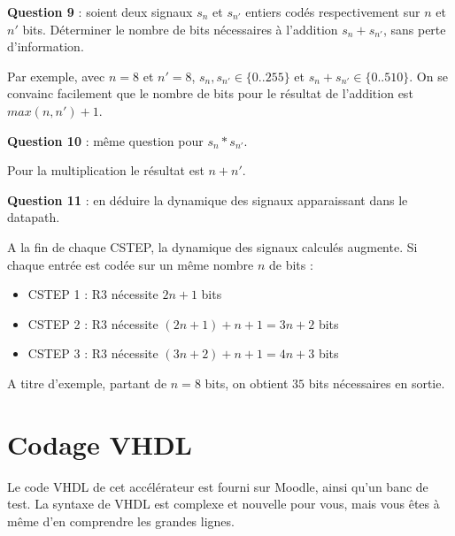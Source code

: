 \documentclass[a4paper,11pt]{exam}
\begin{document}
\begin{questions}

  \question \textbf{Question 9} : soient deux signaux $s_n$ et $s_{n'}$ entiers codés respectivement sur $n$ et $n'$ bits. Déterminer le nombre de bits nécessaires à l'addition $s_n+s_{n'}$, sans perte d'information.
  \begin{solution}
    Par exemple, avec $n=8$ et $n'=8$, $s_n,s_{n'} \in \{0..255\}$ et $s_n+s_{n'} \in \{0..510\}$. On se convainc facilement que le nombre de bits pour le résultat de l'addition est $max(n,n')+1$.
  \end{solution}

  \question \textbf{Question 10} : même question pour $s_n*s_{n'}$.
  \begin{solution}
    Pour la multiplication le résultat est $n+n'$.
  \end{solution}

  \question \textbf{Question 11} : en déduire la dynamique des signaux apparaissant dans le datapath.
  \begin{solution}
A la fin de chaque CSTEP, la dynamique des signaux calculés augmente. Si chaque entrée est codée sur un même nombre $n$ de bits :
  \begin{itemize}
    \item CSTEP 1 : R3 nécessite $2n+1$ bits
    \item CSTEP 2 : R3 nécessite $(2n+1)+n+1=3n+2$ bits
    \item CSTEP 3 : R3 nécessite $(3n+2)+n+1=4n+3$ bits
  \end{itemize}
  A titre d'exemple, partant de $n=8$ bits, on obtient $35$ bits nécessaires en sortie.
  \end{solution}
\end{questions}

\section{Codage VHDL}

Le code VHDL de cet accélérateur est fourni sur Moodle, ainsi qu'un banc de test. La syntaxe de VHDL est complexe et nouvelle pour vous, mais vous êtes à même d'en comprendre les grandes lignes.
\end{document}
